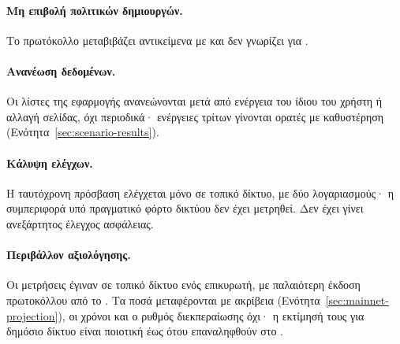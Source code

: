 \paragraph{Μη επιβολή πολιτικών δημιουργών.} Το πρωτόκολλο μεταβιβάζει αντικείμενα με
 και δεν γνωρίζει για .

\paragraph{Ανανέωση δεδομένων.} Οι λίστες της εφαρμογής ανανεώνονται μετά από ενέργεια
του ίδιου του χρήστη ή αλλαγή σελίδας, όχι περιοδικά· ενέργειες τρίτων γίνονται ορατές με
καθυστέρηση (Ενότητα~\ref{sec:scenario-results}).

\paragraph{Κάλυψη ελέγχων.} Η ταυτόχρονη πρόσβαση ελέγχεται μόνο σε τοπικό δίκτυο, με
δύο λογαριασμούς· η συμπεριφορά υπό πραγματικό φόρτο δικτύου δεν έχει μετρηθεί. Δεν έχει
γίνει ανεξάρτητος έλεγχος ασφάλειας.

\paragraph{Περιβάλλον αξιολόγησης.} Οι μετρήσεις έγιναν σε τοπικό δίκτυο ενός επικυρωτή,
με παλαιότερη έκδοση πρωτοκόλλου από το . Τα ποσά  μεταφέρονται με
ακρίβεια (Ενότητα~\ref{sec:mainnet-projection}), οι χρόνοι και ο ρυθμός διεκπεραίωσης
όχι· η εκτίμησή τους για δημόσιο δίκτυο είναι ποιοτική έως ότου επαναληφθούν στο
.
